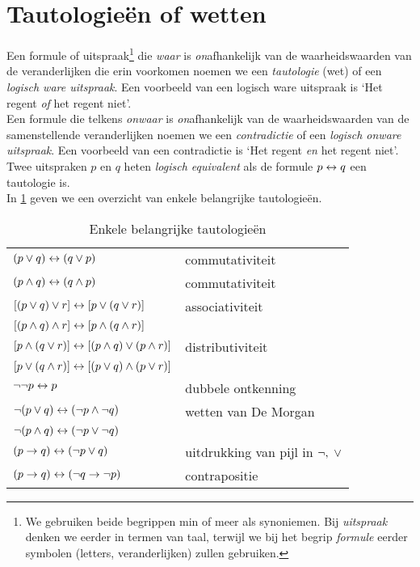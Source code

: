 \section{Tautologie\"{e}n of wetten}
\label{sec:logTautologie}
Een formule of uitspraak\footnote{We gebruiken beide begrippen min of meer als synoniemen. Bij \emph{uitspraak} denken we eerder in termen van taal, terwijl we bij het begrip \emph{formule} eerder symbolen (letters, veranderlijken) zullen gebruiken.} die \emph{waar} is \emph{on}afhankelijk van de waarheidswaarden van de veranderlijken die erin voorkomen noemen we een \emph{tautologie} (wet) of een \emph{logisch ware uitspraak}. Een voorbeeld van een logisch ware uitspraak is `Het regent \emph{of} het regent niet'.\\


\noindent
Een formule die telkens \emph{onwaar} is \emph{on}afhankelijk van de waarheidswaarden van de samenstellende veranderlijken noemen we een \emph{contradictie} of een \emph{logisch onware uitspraak}. Een voorbeeld van een contradictie is `Het regent \emph{en} het regent niet'.\\

\noindent
Twee uitspraken $p$ en $q$ heten \emph{logisch equivalent} als de formule $p \leftrightarrow q$ een tautologie is.\\


\noindent
In \cref{tautologie} geven we een overzicht van enkele belangrijke tautologieën.


\begin{table}[htb]
\centering
\begin{tabular}{|ll|}
\hline
$(p \vee q)\leftrightarrow (q\vee p)$ & commutativiteit  \\
$(p \wedge q)\leftrightarrow (q\wedge p)$ & commutativiteit\\
$\left[\left(p\vee q\right)\vee r\right]\leftrightarrow\left[p\vee\left(q\vee r\right)\right]$ &associativiteit \\
$\left[\left(p\wedge q\right)\wedge r\right]\leftrightarrow\left[p\wedge\left(q\wedge r\right)\right]$& \\
$\left[  p\wedge(q\vee r) \right]\leftrightarrow\left[ (p\wedge q)\vee(p\wedge r) \right] $& distributiviteit \\
$\left[  p\vee(q\wedge r) \right]\leftrightarrow\left[ (p\vee q)\wedge(p\vee r) \right] $& \\
$\neg \neg p \leftrightarrow p$ & dubbele ontkenning \\
$ \neg (p \vee q) \leftrightarrow (\neg p \wedge \neg q) $ & wetten van De Morgan \\
$ \neg (p \wedge q) \leftrightarrow (\neg p \vee \neg q) $ & \\
$ (p\rightarrow q) \leftrightarrow (\neg p \vee q) $ & uitdrukking van pijl in $\neg,~\vee$ \\
$(p \rightarrow q) \leftrightarrow (\neg q \rightarrow \neg p)$ & contrapositie \\

\hline
\end{tabular}
\caption{Enkele belangrijke tautologieën}
\label{tautologie}
\end{table}

